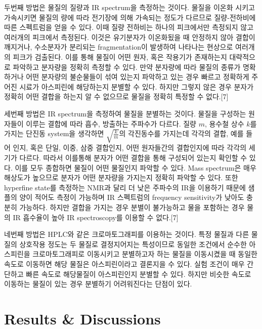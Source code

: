 \documentclass[%
 reprint,
 amsmath,amssymb,
 aps,
]{revtex4-2}
\begin{document}
 두번째 방법은 물질의 질량과 IR spectrum을 측정하는 것이다. 물질을 이온화 시키고 가속시키면 물질의 량에 따라 전기장에 의해 가속되는 정도가 다르므로 질량-전하비에 따른 스펙트럼을 얻을 수 있다. 이때 질량 전하비는 하나의 피크에서만 측정되지 않고 여러개의 피크에서 측정된다. 이것은 유기분자가 이온화됬을 때 안정하지 않아 결합이 깨지거나, 수소분자가 분리되는 fragmentation이 발생하여 나타나는 현상으로 여러개의 피크가 검출된다. 이를 통해 물질이 어떤 원자, 혹은 작용기가 존재하는지 대략적으로 파악하고 분자량을 정확히 측정할 수 있다. 만약 분자량에 따라 물질의 종류가 명확하거나 어떤 분자량의 불순물들이 섞여 있는지 파악하고 있는 경우 빠르고 정확하게 주어진 시료가 아스피린에 해당하는지 분별할 수 있다. 하지만 그렇지 않은 경우 분자가 정확히 어떤 결합을 하는지 알 수 없으므로 물질을 정확히 특정할 수 없다.[7]

 세번째 방법은 IR spectrum을 측정하여 물질을 분별하는 것이다. 물질을 구성하는 원자들이 이루는 결합에 따라 흡수, 방출하는 주파수가 다르다. 질량 $m$, 용수철 상수 $k$를 가지는 단진동 system을 생각하면 $\sqrt{\frac{k}{m}}$의 각진동수를 가지는데 각각의 결합, 예를 들어 인지, 혹은 단일, 이중, 삼중 결합인지, 어떤 원자들간의 결합인지에 따라 각각의 세기가 다르다. 따라서 이를통해 분자가 어떤 결합을 통해 구성되어 있는지 확인할 수 있다. 이를 모두 종합하면 물질이 어떤 물질인지 파악할 수 있다. Mass spectrum은 매우 해상도가 높으므로 분자가 어떤 분자량을 가지는지 정확히 파악할 수 있다. 또한 hyperfine state를 측정하는 NMR과 달리 더 낮은 주파수의 IR을 이용하기 때문에 샘플의 양이 적어도 측정이 가능하며 IR 스펙트럼의 frequency sensitivity가 낮아도 충분히 가능하다. 하지만 결합을 가지는 경우 분별이 불가능하고 물을 포함하는 경우 물의 IR 흡수율이 높아 IR spectroscopy를 이용할 수 없다.[7]

 네번째 방법은 HPLC와 같은 크로마토그래피를 이용하는 것이다. 특정 물질과 다른 물질의 상호작용 정도는 두 물질로 결정지어지는 특성이므로 동일한 조건에서 순수한 아스피린을 크로마토그래피로 이동시키고 분별하고자 하는 물질을 이동시켰을 때 동일한 속도로 이동하면 해당 물질은 아스피린이라고 결론지을 수 있다. 실험 조건이 매우 간단하고 빠른 속도로 해당물질이 아스피린인지 분별할 수 있다. 하지만 비슷한 속도로 이동하는 물질이 있는 경우 분별하기 어려워진다는 단점이 있다.


\section{\label{sec:level1} Results \& Discussions}
\end{document}
